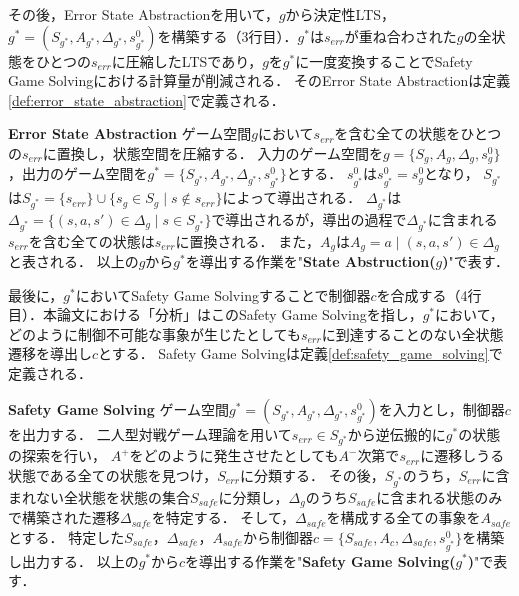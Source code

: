 その後，Error State Abstractionを用いて，$g$から決定性LTS，$g^* = (S_{g^*}, A_{g^*}, \Delta_{g^*}, s^0_{g^*})$を構築する（3行目）．$g^*$は$s_{err}$が重ね合わされた$g$の全状態をひとつの$s_{err}$に圧縮したLTSであり，$g$を$g^*$に一度変換することでSafety Game Solvingにおける計算量が削減される．
そのError State Abstractionは定義\ref{def:error_state_abstraction}で定義される．
\begin{dfn}{\textbf{Error State Abstraction}}
\label{def:error_state_abstraction}
    ゲーム空間$g$において$s_{err}$を含む全ての状態をひとつの$s_{err}$に置換し，状態空間を圧縮する．
    入力のゲーム空間を$g = \{S_{g}, A_{g}, \Delta_{g}, s^0_{g}\}$，出力のゲーム空間を$g^* = \{S_{g^*}, A_{g^*}, \Delta_{g^*}, s^0_{g^*}\}$とする．
    $s^0_{g^*}$は$s^0_{g^*} = s^0_{g}$となり，
    $S_{g^*}$は$S_{g^*} = \{s_{err}\} \cup \{ s_{g} \in S_{g} \mid s \notin s_{err} \}$によって導出される．
    $\Delta_{g^*}$は$\Delta_{g^*} = \{ (s,a,s') \in \Delta_{g} \mid s \in S_{g^*} \}$で導出されるが，導出の過程で$\Delta_{g^*}$に含まれる$s_{err}$を含む全ての状態は$s_{err}$に置換される．
    また，$A_{g}$は$A_{g} = { a \mid (s,a,s') \in \Delta_{g}}$と表される．
    以上の$g$から$g^*$を導出する作業を"{\bf State Abstruction($g$)}"で表す．
\end{dfn}

最後に，$g^*$においてSafety Game Solvingすることで制御器$c$を合成する（4行目）．本論文における「分析」はこのSafety Game Solvingを指し，$g^*$において，どのように制御不可能な事象が生じたとしても$s_{err}$に到達することのない全状態遷移を導出し$c$とする．
Safety Game Solvingは定義\ref{def:safety_game_solving}で定義される．

\begin{dfn}{\textbf{Safety Game Solving}}
\label{def:safety_game_solving}
    ゲーム空間$g^* = (S_{g^*}, A_{g^*}, \Delta_{g^*}, s^0_{g^*})$を入力とし，制御器$c$を出力する．
    二人型対戦ゲーム理論を用いて$s_{err} \in S_{g^*}$から逆伝搬的に$g^*$の状態の探索を行い，
    $A^+$をどのように発生させたとしても$A^-$次第で$s_{err}$に遷移しうる状態である全ての状態を見つけ，$S_{err}$に分類する．
    その後，$S_{g^*}$のうち，$S_{err}$に含まれない全状態を状態の集合$S_{safe}$に分類し，$\Delta_{g}$のうち$S_{safe}$に含まれる状態のみで構築された遷移$\Delta_{safe}$を特定する．
    そして，$\Delta_{safe}$を構成する全ての事象を$A_{safe}$とする．
    特定した$S_{safe}$，$\Delta_{safe}$，$A_{safe}$から制御器$c=\{S_{safe}, A_{c}, \Delta_{safe}, s^0_{g^*}\}$を構築し出力する．
    以上の$g^*$から$c$を導出する作業を"{\bf Safety Game Solving($g^*$)}"で表す．
\end{dfn}


